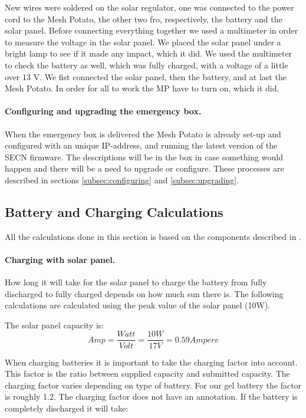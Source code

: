 New wires were soldered on the solar regulator, one was connected to the power cord to the Mesh Potato, the other two fro, respectively, the battery and the solar panel. Before connecting everything together we used a multimeter in order to measure the voltage in the solar panel. We placed the solar panel under a bright lamp to see if it made any impact, which it did. We used the multimeter to check the battery as well, which was fully charged, with a voltage of a little over 13 V. 
We fist connected the solar panel, then the battery, and at last the Mesh Potato. In order for all to work the MP have to turn on, which it did.  

\paragraph{Configuring and upgrading the emergency box.}
When the emergency box is delivered the Mesh Potato is already set-up and configured with an unique IP-address, and running the latest version of the SECN firmware. The descriptions will be in the box in case something would happen and there will be a need to upgrade or configure. These processes are described in sections \ref{subsec:configuring} and \ref{subsec:upgrading}.

\subsection{Battery and Charging Calculations}
All the calculations done in this section is based on the components described in . 

\paragraph{Charging with solar panel.}
How long it will take for the solar panel to charge the battery from fully discharged to fully charged depends on how much sun there is. The following calculations are calculated using the peak value of the solar panel (10W). 

The solar panel capacity is:
$$Amp = \frac{Watt}{Volt} = \frac{10 W}{17 V} = 0.59 Ampere$$

When charging batteries it is important to take the charging factor into account. This factor is the ratio between supplied capacity and submitted capacity. The charging factor varies depending on type of battery. For our gel battery the factor is roughly 1.2. The charging factor does not have an annotation. 
If the battery is completely discharged it will take: 

